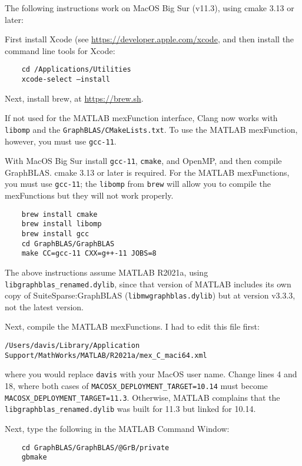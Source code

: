 \documentclass[12pt]{article}
\begin{document}
The following instructions work on MacOS Big Sur (v11.3), using
cmake 3.13 or later:

First install Xcode (see \url{https://developer.apple.com/xcode},
and then install the command line tools for Xcode:

    {\small
    \begin{verbatim}
    cd /Applications/Utilities
    xcode-select —install \end{verbatim} }

Next, install brew, at \url{https://brew.sh}.

If not used for the MATLAB mexFunction interface,
Clang now works with \verb'libomp' and the \verb'GraphBLAS/CMakeLists.txt'.
To use the MATLAB mexFunction, however, you must use \verb'gcc-11'.

With MacOS Big Sur install \verb'gcc-11', \verb'cmake', and OpenMP, and then
compile GraphBLAS.  cmake 3.13 or later is required.
For the MATLAB mexFunctions, you must use \verb'gcc-11'; the
\verb'libomp' from \verb'brew' will allow you to compile the mexFunctions
but they will not work properly.

    {\small
    \begin{verbatim}
    brew install cmake
    brew install libomp
    brew install gcc
    cd GraphBLAS/GraphBLAS
    make CC=gcc-11 CXX=g++-11 JOBS=8 \end{verbatim} }

The above instructions assume MATLAB R2021a, using
\verb'libgraphblas_renamed.dylib', since that version of MATLAB includes its
own copy of SuiteSparse:GraphBLAS (\verb'libmwgraphblas.dylib') but at version
v3.3.3, not the latest version.

Next, compile the MATLAB mexFunctions.  I had to edit this file first:

{\small
\begin{verbatim}
/Users/davis/Library/Application Support/MathWorks/MATLAB/R2021a/mex_C_maci64.xml \end{verbatim} }

where you would replace \verb'davis' with your MacOS user name.
Change lines 4 and 18, where both cases of \verb'MACOSX_DEPLOYMENT_TARGET=10.14'
must become \verb"MACOSX_DEPLOYMENT_TARGET=11.3".  Otherwise, MATLAB
complains that the \verb'libgraphblas_renamed.dylib' was built for 11.3 but
linked for 10.14.

Next, type the following in the MATLAB Command
Window:

    {\small
    \begin{verbatim}
    cd GraphBLAS/GraphBLAS/@GrB/private
    gbmake \end{verbatim} }
\end{document}
